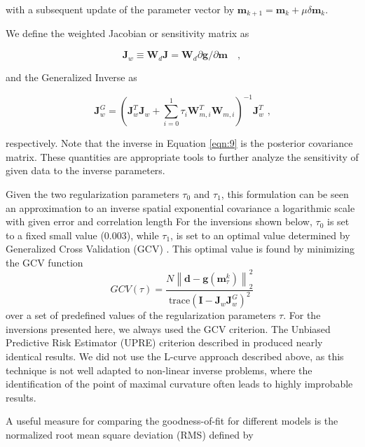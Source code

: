 \documentclass[cp]{copernicus}
\begin{document}
 \noindent with a subsequent update of the parameter vector by 
 $\mathbf{m}_{k + 1} = \mathbf{m}_k + \mu \delta\mathbf{m}_k$.

We define the weighted Jacobian or sensitivity matrix as

\begin{equation}\label{eqn:8}
\mathbf{J}_w \equiv \mathbf{W}_d\mathbf{J} = 
\mathbf{W}_d\partial{\mathbf{g}}/\partial {\mathbf{m}}\quad, 
\end{equation} 

and the Generalized Inverse as

\begin{equation}\label{eqn:9}
\mathbf{J}_w^G  = \left(\mathbf{J}_w^T \mathbf{J}_w^{} + 
\sum\limits_{i = 0}^1 \tau_i \mathbf{W}_{m,i}^T \mathbf{W}_{m,i}^{}\right)^{-1} 
\mathbf{J}_w^T{\text{  ,}}
\end{equation} 

respectively. Note that the inverse in Equation \ref{eqn:9} is the posterior covariance matrix. 
These quantities are appropriate tools to further analyze the sensitivity of given data to the 
inverse parameters. 

Given the two regularization parameters $\tau_0$ and $\tau_1$, this formulation can be seen an 
approximation to an inverse spatial exponential covariance a logarithmic scale with given error and 
correlation length \citep{Rodgers2000a, Tarantola2005a} For the inversions shown below, $\tau_0$ is 
set to a fixed small value (0.003), while $\tau_1$, is set to an optimal value determined by 
Generalized Cross Validation (GCV) \citep{Rath2007a,Farquharson2004a,Wahba1990a}. This optimal value 
is found by minimizing the GCV function 
\begin{equation}\label{eqn:10}
GCV(\tau ) = \frac
{N\left\| \mathbf{d} - \mathbf{g}(\mathbf{m}_\tau ^k) \right\|_2^2}
{\text{trace}
\left(\mathbf{I} - \mathbf{J}_w^{}\mathbf{J}_w^G \right)^2} 
\end{equation} 
\noindent over a set of predefined values of the regularization parameters $\tau$. For the 
inversions presented here, we always used the GCV criterion. The Unbiased Predictive Risk Estimator 
(UPRE) criterion described in \citet{Vogel2002a} produced nearly identical results. We did not use 
the L-curve approach described above, as this technique is not well adapted to non-linear inverse 
problems, where the identification of the point of maximal curvature often leads to highly 
improbable results. 

A useful measure for comparing the goodness-of-fit for different models is the normalized root mean 
square deviation (RMS) defined by
 
\end{document}
